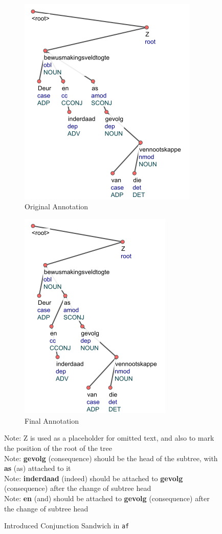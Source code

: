 \begin{figure}[H]
    \begin{subfigure}{.48\textwidth}
    \centering
    \includegraphics[scale=0.8]{img/siblingAttach-af-1.png}
    \caption{Original Annotation}
    \label{fig:siblingAttach-af-1}
    \end{subfigure}
    \begin{subfigure}{.5\textwidth}
    \centering
    \includegraphics[scale=0.8]{img/siblingAttach-af-2.png}
    \caption{Final Annotation}
    \label{fig:siblingAttach-af-2}
    \end{subfigure}
    \caption{Introduced Conjunction Sandwich in \texttt{af}}
    \label{fig:siblingAttach-af}
    Note: Z is used as a placeholder for omitted text, and also to mark the position of the root of the tree\\
    Note: \textbf{gevolg} (consequence) should be the head of the subtree, with \textbf{as} (as) attached to it\\
    Note: \textbf{inderdaad} (indeed) should be attached to \textbf{gevolg} (consequence) after the change of subtree head\\
    Note: \textbf{en} (and) should be attached to \textbf{gevolg} (consequence) after the change of subtree head
\end{figure}


